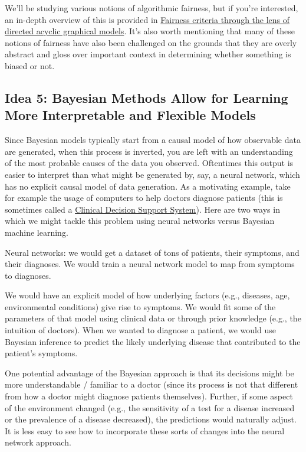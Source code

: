 \documentclass[assignment01_Solutions]{subfiles}
\begin{document}
We'll be studying various notions of algorithmic fairness, but if you're interested, an in-depth overview of this is provided in \href{https://arxiv.org/pdf/1906.11333.pdf}{Fairness criteria through the lens of directed acyclic graphical models}.  It's also worth mentioning that many of these notions of fairness have also been challenged on the grounds that they are overly abstract and gloss over important context in determining whether something is biased or not.


\subsection*{Idea 5: Bayesian Methods Allow for Learning More Interpretable and Flexible Models}

Since Bayesian models typically start from a causal model of how observable data are generated, when this process is inverted, you are left with an understanding of the most probable causes of the data you observed.  Oftentimes this output is easier to interpret than what might be generated by, say, a neural network, which has no explicit causal model of data generation.  As a motivating example, take for example the usage of computers to help doctors diagnose patients (this is sometimes called a \href{https://en.wikipedia.org/wiki/Clinical_decision_support_system}{Clinical Decision Support System}).  Here are two ways in which we might tackle this problem using neural networks versus Bayesian machine learning.

\bi
\item Neural networks: we would get a dataset of tons of patients, their symptoms, and their diagnoses.  We would train a neural network model to map from symptoms to diagnoses.
\item We would have an explicit model of how underlying factors (e.g., diseases, age, environmental conditions) give rise to symptoms.  We would fit some of the parameters of that model using clinical data or through prior knowledge (e.g., the intuition of doctors).  When we wanted to diagnose a patient, we would use Bayesian inference to predict the likely underlying disease that contributed to the patient's symptoms.
\ei
 
One potential advantage of the Bayesian approach is that its decisions might be more understandable / familiar to a doctor (since its process is not that different from how a doctor might diagnose patients themselves).  Further, if some aspect of the environment changed (e.g., the sensitivity of a test for a disease increased or the prevalence of a disease decreased), the predictions would naturally adjust.  It is less easy to see how to incorporate these sorts of changes into the neural network approach.
 
\end{document}
